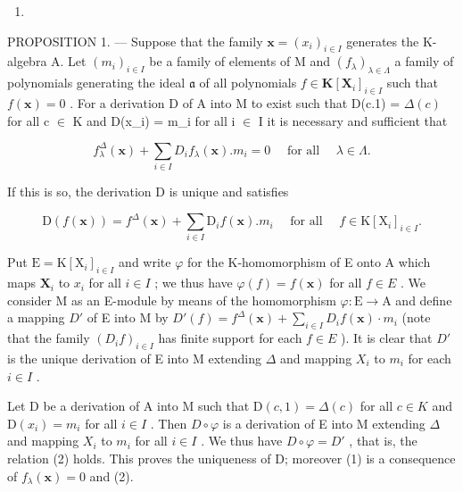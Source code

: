 \begin{enumerate}
\def\labelenumi{\Alph{enumi}.}
\setcounter{enumi}{12}
\tightlist
\item
\end{enumerate}

PROPOSITION 1. --- Suppose that the family \(\mathbf{x} = (x_i)_{i \in I}\) generates the K-algebra A. Let \((m_i)_{i \in I}\) be a family of elements of M and \((f_\lambda)_{\lambda \in \Lambda}\) a family of polynomials generating the ideal \(\mathfrak{a}\) of all polynomials \(f \in \mathbf{K}[\mathbf{X}_i]_{i \in I}\) such that \(f(\mathbf{x}) = 0\) . For a derivation D of A into M to exist such that D(c.1) = \(\Delta(c)\) for all c \(\in\) K and D(x\_i) = m\_i for all i \(\in\) I it is necessary and sufficient that

\[
f _ {\lambda} ^ {\Delta} (\mathbf {x}) + \sum_ {i \in I} D _ {i} f _ {\lambda} (\mathbf {x}). m _ {i} = 0 \quad \text { for   all } \quad \lambda \in \Lambda .\tag{1}
\]

If this is so, the derivation D is unique and satisfies

\[
\mathrm{D} (f (\mathbf {x})) = f ^ {\Delta} (\mathbf {x}) + \sum_ {i \in I} \mathrm{D} _ {i} f (\mathbf {x}). m _ {i} \quad \text { for   all } \quad f \in \mathrm{K} [ \mathrm{X} _ {i} ] _ {i \in I}.\tag{2}
\]

Put \(\mathrm{E} = \mathrm{K}[\mathrm{X}_i]_{i \in I}\) and write \(\varphi\) for the K-homomorphism of E onto A which maps \(\mathbf{X}_i\) to \(x_i\) for all \(i \in I\) ; we thus have \(\varphi(f) = f(\mathbf{x})\) for all \(f \in E\) . We consider M as an E-module by means of the homomorphism \(\varphi: \mathrm{E} \to \mathrm{A}\) and define a mapping \(D'\) of E into M by \(D'(f) = f^{\Delta}(\mathbf{x}) + \sum_{i \in I} D_i f(\mathbf{x}) \cdot m_i\) (note that the family \((D_i f)_{i \in I}\) has finite support for each \(f \in E\) ). It is clear that \(D'\) is the unique derivation of E into M extending \(\Delta\) and mapping \(X_i\) to \(m_i\) for each \(i \in I\) .

Let D be a derivation of A into M such that \(\mathrm{D}(c,1)=\Delta(c)\) for all \(c\in K\) and \(\mathrm{D}(x_{i})=m_{i}\) for all \(i\in I\) . Then \(D\circ\varphi\) is a derivation of E into M extending \(\Delta\) and mapping \(X_{i}\) to \(m_{i}\) for all \(i\in I\) . We thus have \(D\circ\varphi=D'\) , that is, the relation (2) holds. This proves the uniqueness of D; moreover (1) is a consequence of \(f_{\lambda}(\mathbf{x})=0\) and (2).

